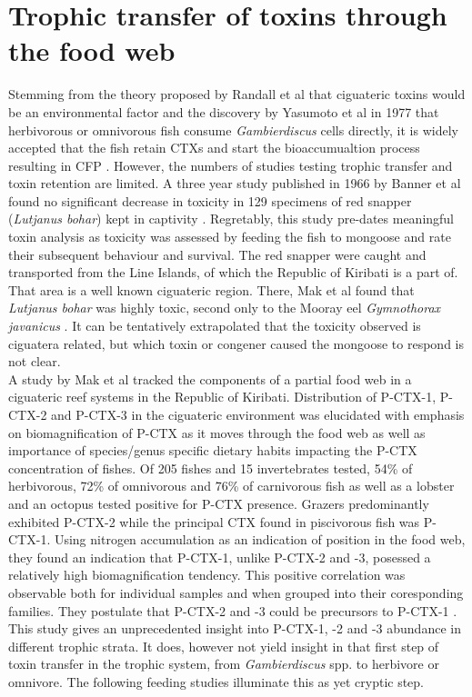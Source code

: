 \documentclass[12pt]{article}
\begin{document}
\FloatBarrier

\section{Trophic transfer of toxins through the food web}

Stemming from the theory proposed by Randall et al that ciguateric toxins would be an environmental factor and the discovery by Yasumoto et al in 1977 that herbivorous or omnivorous fish consume \emph{Gambierdiscus} cells directly, it is widely accepted that the fish retain CTXs and start the bioaccumualtion process resulting in CFP \cite{randall1958review,yasumoto1977finding}.
However, the numbers of studies testing trophic transfer and toxin retention are limited.
A three year study published in 1966 by Banner et al found no significant decrease in toxicity in 129 specimens of red snapper (\emph{Lutjanus bohar}) kept in captivity \cite{banner1966retention}. Regretably, this study pre-dates meaningful toxin analysis as toxicity was assessed by feeding the fish to mongoose and rate their subsequent behaviour and survival. The red snapper were caught and transported from the Line Islands, of which the Republic of Kiribati is a part of. That area is a well known ciguateric region. There, Mak et al found that \emph{Lutjanus bohar} was highly toxic, second only to the Mooray eel \emph{Gymnothorax javanicus} \cite{mak2013pacific}. It can be tentatively extrapolated that the toxicity observed is ciguatera related, but which toxin or congener caused the mongoose to respond is not clear. \\

A study by Mak et al tracked the components of a partial food web in a ciguateric reef systems in the Republic of Kiribati. Distribution of P-CTX-1, P-CTX-2 and P-CTX-3 in the ciguateric environment was elucidated with emphasis on biomagnification of P-CTX as it moves through the food web as well as importance of species/genus specific dietary habits impacting the P-CTX concentration of fishes. Of 205 fishes and 15 invertebrates tested, 54\% of herbivorous, 72\% of omnivorous and 76\% of carnivorous fish as well as a lobster and an octopus tested positive for P-CTX presence. Grazers predominantly exhibited P-CTX-2 while the principal CTX found in piscivorous fish was P-CTX-1. Using nitrogen accumulation as an indication of position in the food web, they found an indication that P-CTX-1, unlike P-CTX-2 and -3, posessed a relatively high biomagnification tendency. This positive correlation was observable both for individual samples and when grouped into their coresponding families. They postulate that P-CTX-2 and -3 could be precursors to P-CTX-1 \cite{mak2013pacific}. This study gives an unprecedented insight into P-CTX-1, -2 and -3 abundance in different trophic strata. It does, however not yield insight in that first step of toxin transfer in the trophic system, from \emph{Gambierdiscus} spp. to herbivore or omnivore. The following feeding studies illuminate this as yet cryptic step. 
\end{document}
